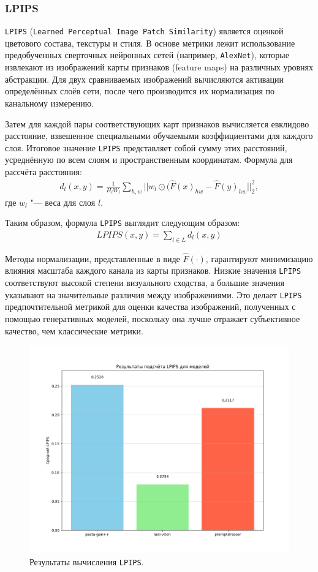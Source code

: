 \subsubsection{LPIPS}
\texttt{LPIPS} (\texttt{Learned Perceptual Image Patch Similarity}) является оценкой цветового состава, текстуры и стиля. В основе метрики лежит использование предобученных сверточных нейронных сетей (например, \texttt{AlexNet}), которые извлекают из изображений карты признаков (feature maps) на различных уровнях абстракции. Для двух сравниваемых изображений вычисляются активации определённых слоёв сети, после чего производится их нормализация по канальному измерению.

Затем для каждой пары соответствующих карт признаков вычисляется евклидово расстояние, взвешенное специальными обучаемыми коэффициентами для каждого слоя. Итоговое значение \texttt{LPIPS} представляет собой сумму этих расстояний, усреднённую по всем слоям и пространственным координатам. Формула для рассчёта расстояния:
\begin{gather}
    d_l(x, y) = \frac{1}{H_lW_l}\sum_{h, w}||w_l \odot (\hat{F}(x)_{hw} - \hat{F}(y)_{hw}||_2^2,
\end{gather}
где $w_l$ "--- веса для слоя $l$.

Таким образом, формула \texttt{LPIPS} выглядит следующим образом:
\begin{gather}
    LPIPS(x, y) = \sum_{l \in L}d_l(x, y)
\end{gather}

Методы нормализации, представленные в виде $\hat{F}(\cdot)$, гарантируют минимизацию влияния масштаба каждого канала из карты признаков. Низкие значения \texttt{LPIPS} соответствуют высокой степени визуального сходства, а большие значения указывают на значительные различия между изображениями. Это делает \texttt{LPIPS} предпочтительной метрикой для оценки качества изображений, полученных с помощью генеративных моделей, поскольку она лучше отражает субъективное качество, чем классические метрики.

\begin{figure}[H]
    \centering
    \includegraphics[width=0.9\linewidth]{images/lpips_results.png}
    \caption{Результаты вычисления \texttt{LPIPS}.}
    \label{fig:lpips_results} 
\end{figure}

